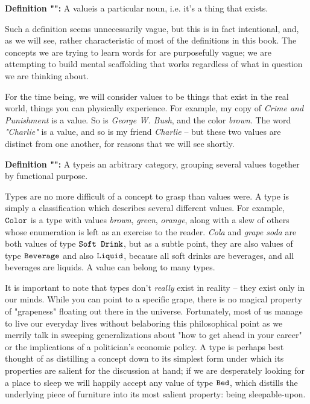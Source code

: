 \documentclass[12pt]{book}
\newcommand{\aside}[1]{#1}
\renewcommand{\value}[1]{\textit{#1}}
\newcommand{\type}[1]{\ensuremath{\text{\texttt{#1}}}}
\newcommand{\what}{}
\newcommand{\defn}[2]{\renewcommand{\what}{#1}\textbf{Definition "\titlecap{#1}":} #2}
\begin{document}
\defn{value}{A \what is a particular noun, i.e. it's a thing that exists.}

\aside{Such a definition seems unnecessarily vague, but this is in fact intentional, and, as we will see, rather
characteristic of most of the definitions in this book. The concepts we are trying to learn words for are purposefully
vague; we are attempting to build mental scaffolding that works regardless of what in question we are thinking about.}

For the time being, we will consider values to be things that exist in the real world, things you can physically
experience. For example, my copy of \value{Crime and Punishment} is a value. So is \value{George W. Bush}, and the color
\value{brown}. The word \value{"Charlie"} is a value, and so is my friend \value{Charlie} -- but these two values are
distinct from one another, for reasons that we will see shortly.

\defn{type}{A \what is an arbitrary category, grouping several values together by functional purpose.}

Types are no more difficult of a concept to grasp than values were. A type is simply a classification which describes
several different values. For example, \type{Color} is a type with values \value{brown}, \value{green},
\value{orange}, along with a slew of others whose enumeration is left as an exercise to the reader. \value{Cola} and
\value{grape soda} are both values of type \type{Soft Drink}, but as a subtle point, they are also values of type
\type{Beverage} and also \type{Liquid}, because all soft drinks are beverages, and all beverages are liquids. A
value can belong to many types.

It is important to note that types don't \textit{really} exist in reality -- they exist only in our minds. While you can
point to a specific grape, there is no magical property of "grapeness" floating out there in the universe. Fortunately,
most of us manage to live our everyday lives without belaboring this philosophical point as we merrily talk in sweeping
generalizations about "how to get ahead in your career" or the implications of a politician's economic
policy. A type is perhaps best thought of as distilling a concept down to
its simplest form under which its properties are salient for the discussion at hand; if we are desperately looking for a
place to sleep we will happily accept any value of type \type{Bed}, which distills the underlying piece of furniture
into its most salient property: being sleepable-upon.
\end{document}
